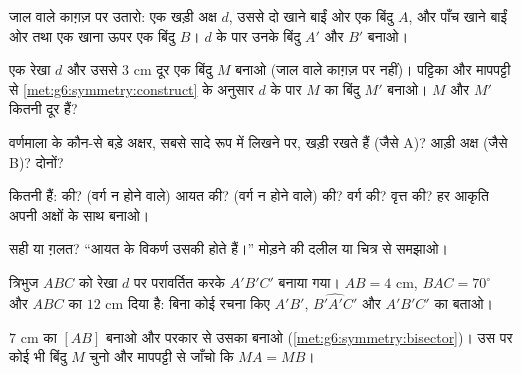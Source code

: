 \begin{exercise}[$\star$]\label{exo:g6:symmetry:1}
जाल वाले काग़ज़ पर उतारो: एक खड़ी अक्ष $d$, उससे दो खाने बाईं ओर
एक बिंदु $A$, और पाँच खाने बाईं ओर तथा एक खाना ऊपर एक बिंदु $B$।
$d$ के पार उनके  बिंदु $A'$ और $B'$ बनाओ।
\end{exercise}

\begin{exercise}[$\star$]\label{exo:g6:symmetry:2}
एक रेखा $d$ और उससे $3$ cm दूर एक बिंदु $M$ बनाओ (जाल वाले काग़ज़
पर नहीं)।  पट्टिका और मापपट्टी से \cref{met:g6:symmetry:construct}
के अनुसार $d$ के पार $M$ का  बिंदु $M'$ बनाओ। $M$ और
$M'$ कितनी दूर हैं?
\end{exercise}

\begin{exercise}[$\star$]\label{exo:g6:symmetry:3}
वर्णमाला के कौन-से बड़े अक्षर, सबसे सादे रूप में लिखने पर, खड़ी
 रखते हैं (जैसे A)? आड़ी अक्ष (जैसे B)?
दोनों?
\end{exercise}

\begin{exercise}[$\star$]\label{exo:g6:symmetry:4}
कितनी  हैं:  की? (वर्ग न होने वाले)
आयत की? (वर्ग न होने वाले)  की? वर्ग की? वृत्त की?
हर आकृति अपनी अक्षों के साथ बनाओ।
\end{exercise}

\begin{exercise}[$\star$]\label{exo:g6:symmetry:5}
सही या ग़लत? ``आयत के विकर्ण उसकी  होते हैं।''
मोड़ने की दलील या चित्र से समझाओ।
\end{exercise}

\begin{exercise}[$\star$]\label{exo:g6:symmetry:6}
त्रिभुज $ABC$ को रेखा $d$ पर परावर्तित करके $A'B'C'$ बनाया गया।
$AB = 4$ cm, $\widehat{BAC} = 70^\circ$ और $ABC$ का 
$12$ cm दिया है: बिना कोई रचना किए $A'B'$,
$\widehat{B'A'C'}$ और $A'B'C'$ का  बताओ।
\end{exercise}

\begin{exercise}[$\star$]\label{exo:g6:symmetry:7}
$7$ cm का  $[AB]$ बनाओ और परकार से उसका 
बनाओ (\cref{met:g6:symmetry:bisector})। उस पर कोई भी बिंदु $M$
चुनो और मापपट्टी से जाँचो कि $MA = MB$।
\end{exercise}

